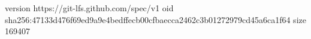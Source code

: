 version https://git-lfs.github.com/spec/v1
oid sha256:47133d476f69ed9a9e4bedffecb00cfbaecca2462c3b01272979cd45a6ca1f64
size 169407
